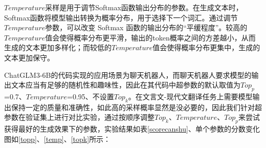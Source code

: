 \documentclass[
    decl-page,  %
    ,fontset = win, %
  ]{njuthesis}
\begin{document}
$Temperature$采样是用于调节Softmax函数输出分布的参数。在生成文本时，Softmax函数将模型输出转换为概率分布，用于选择下一个词汇。通过调节$Temperature$参数，可以改变 Softmax 函数的输出分布的“平缓程度”。较高的$Temperature$值会使得概率分布更平滑，输出的token概率之间的方差越小，从而生成的文本更加多样化；而较低的$Temperature$值会使得概率分布更集中，生成的文本更加保守。

ChatGLM3-6B的代码实现的应用场景为聊天机器人，而聊天机器人要求模型的输出文本应当有足够的随机性和趣味性，因此在其代码中超参数的默认取值为$Top_p$=0.7、$Temperature$=0.95、不设置$Top_k$。在文言文-现代文翻译任务上需要模型输出保持一定的质量和准确性，如此高的采样概率显然是没必要的，因此我们针对超参数在验证集上进行对比实验，通过按顺序调整$Top_k$、$Temperature$、$Top_p$来尝试获得最好的生成效果下的参数，实验结果如表\ref{scorecanshu}、单个参数的分数变化图如\ref{topp}、\ref{temp}、\ref{topk}所示：
\end{document}
